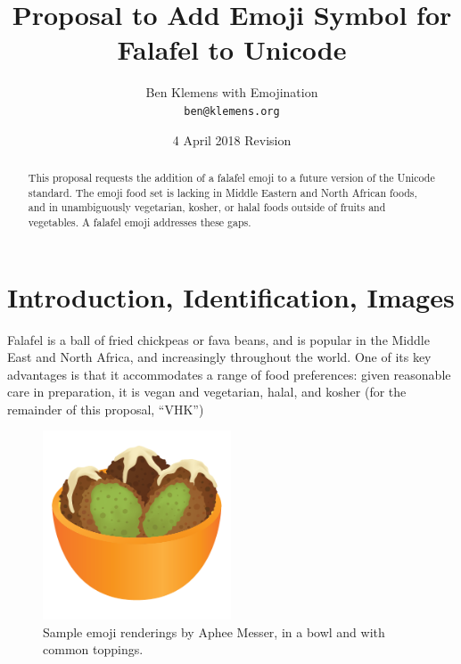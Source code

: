 \documentclass[a4paper,10pt]{article}
\begin{document}




\title{Proposal to Add Emoji Symbol for {\sc Falafel} to Unicode}
\author{Ben Klemens with Emojination\\ {\tt ben@klemens.org}}
\date{4 April 2018 Revision}
\maketitle

\begin{abstract}
This proposal requests the addition of a {\sc falafel} emoji to a future version of the
Unicode standard.  The emoji food set is lacking in Middle Eastern and North African
foods, and in unambiguously vegetarian, kosher, or halal foods outside of fruits and
vegetables. A falafel emoji addresses these gaps.
\end{abstract}


\section{Introduction, Identification, Images}

{\sc Falafel} is a ball of fried chickpeas or fava beans, and is popular in the Middle East
and North Africa, and increasingly throughout the world.  One of its key advantages is
that it accommodates a range of food preferences: given reasonable care in preparation,
it is vegan and vegetarian, halal, and kosher (for the remainder of this proposal, ``VHK'')

\begin{figure}[h]
\begin{center}
\includegraphics[width=2.2in]{falafel-bowl-tahini.png}
\end{center}
\caption{Sample emoji renderings by Aphee Messer, in a bowl and with common toppings.}
\label{apheefig}
\end{figure}
\end{document}
